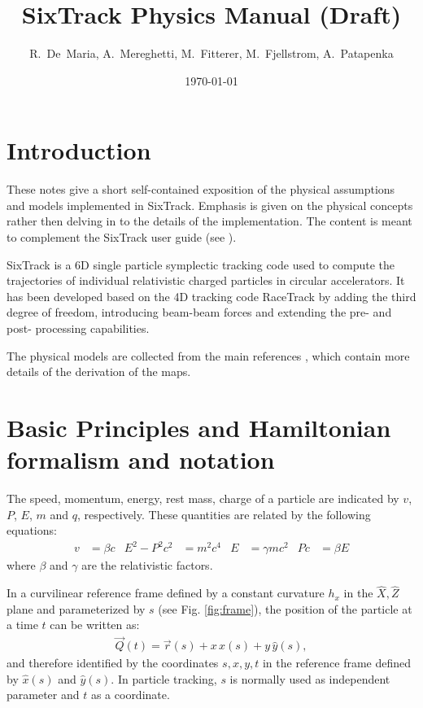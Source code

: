\documentclass[english]{article}
\begin{document}
\author{R.~De~Maria, A.~Mereghetti, M.~Fitterer, M.~Fjellstrom, A.~Patapenka}
\title{SixTrack Physics Manual (Draft)}
\date{\today}

\maketitle

\tableofcontents
\newpage

\section{Introduction}

These notes give a short self-contained exposition of the physical assumptions
and models implemented in SixTrack. Emphasis is given on the physical concepts
rather then delving in to the details of the implementation.  The content is
meant to complement the SixTrack user guide (see \cite{user_guide}).

SixTrack is a 6D single particle symplectic tracking code used to compute the
trajectories of individual relativistic charged particles in circular
accelerators. It has been developed based on the 4D tracking code RaceTrack
\cite{racetrack} by adding the third degree of freedom, introducing beam-beam
forces and extending the pre- and post- processing capabilities.

The physical models are collected from the main references
\cite{ripken85,barber87,ripken95,heinemann95,barber96,beam_beam,rf_multipoles},
which contain more details of the derivation of the maps.

\section{Basic Principles and Hamiltonian formalism and notation}


The speed, momentum, energy, rest mass, charge of a particle are indicated
by $v$, $P$, $E$, $m$ and $q$, respectively.  These quantities are
related by the following equations:
\begin{align}
  v&=\beta c &
  E^2-P^2c^2&=m^2c^4 &
  E & = \gamma mc^2 &
  Pc & =\beta E
\end{align}
where $\beta$ and $\gamma$ are the relativistic factors.

In a curvilinear reference frame defined by a constant curvature $h_x$ in the
$\hat X, \hat Z$ plane and parameterized by $s$  (see Fig. \ref{fig:frame}), the
position of the particle at a time $t$ can be written as:
\begin{align}
  \vec Q(t)= \vec r(s) + x \,\hat x(s) + y\, \hat y(s),
\end{align}
and therefore identified by the coordinates $s, x, y, t$ in the reference frame
defined by $\hat x(s)$ and $\hat y(s)$. In particle tracking, $s$ is normally
used as independent parameter and $t$ as a coordinate.
\end{document}

